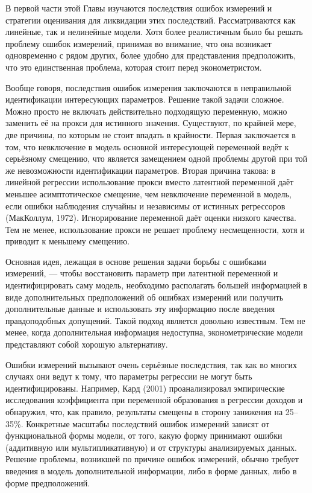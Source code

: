 В первой части этой Главы изучаются последствия ошибок измерений и стратегии оценивания для ликвидации этих последствий. Рассматриваются как линейные, так и нелинейные модели. Хотя более реалистичным было бы решать проблему ошибок измерений, принимая во внимание, что она возникает одновременно с рядом других, более удобно для представления предположить, что это единственная проблема, которая стоит перед эконометристом.

Вообще говоря, последствия ошибок измерения заключаются в неправильной идентификации интересующих параметров. Решение такой задачи сложное. Можно просто не включать действительно подходящую переменную, можно заменить её на прокси для истинного значения. Существуют, по крайней мере, две причины, по которым не стоит впадать в крайности. Первая заключается в том, что невключение в модель основной интересующей переменной ведёт к серьёзному смещению, что является замещением одной проблемы другой при той же невозможности идентификации параметров. Вторая причина такова: в линейной регрессии использование прокси вместо латентной переменной даёт меньшее асимптотическое смещение, чем невключение переменной в модель, если ошибки наблюдения случайны и независимы от истинных регрессоров (МакКоллум, 1972). Игнорирование переменной даёт оценки низкого качества.  Тем не менее, использование прокси не решает проблему несмещенности, хотя и приводит к меньшему смещению.

Основная идея, лежащая в основе решения задачи борьбы с ошибками измерений, --- чтобы восстановить параметр при латентной переменной и  идентифицировать саму модель, необходимо располагать большей информацией в виде дополнительных предположений об ошибках измерений или получить дополнительные данные и использовать эту информацию после введения правдоподобных допущений. Такой подход является довольно известным. Тем не менее, когда дополнительная информация недоступна, эконометрические модели представляют собой хорошую альтернативу.

Ошибки измерений вызывают очень серьёзные последствия, так как во многих случаях они ведут к тому, что параметры регрессии не могут быть идентифицированы. Например, Кард (2001) проанализировал эмпирические исследования коэффициента при переменной образования в регрессии доходов и обнаружил, что, как правило, результаты смещены в сторону занижения на 25--35\%.  Конкретные масштабы последствий ошибок измерений зависят от функциональной формы модели, от того, какую форму принимают ошибки (аддитивную или мультипликативную) и от структуры анализируемых данных. Решение проблемы, возникшей по причине ошибок измерений, обычно требует введения в модель дополнительной информации, либо в форме данных, либо в форме предположений.

